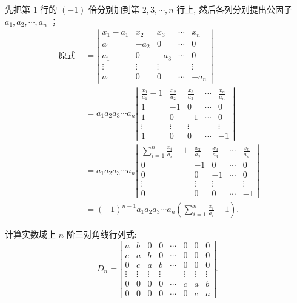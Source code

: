 \begin{solution}
    先把第 1 行的 $(-1)$ 倍分别加到第 $2,3, \cdots, n$ 行上, 然后各列分别提出公因子 $a_1, a_2, \cdots, a_n$ ；
\[
\begin{aligned}
\text { 原式 } & =\left|\begin{array}{ccccc}
x_1-a_1 & x_2 & x_3 & \cdots & x_n \\
a_1 & -a_2 & 0 & \cdots & 0 \\
a_1 & 0 & -a_3 & \cdots & 0 \\
\vdots & \vdots & \vdots & & \vdots \\
a_1 & 0 & 0 & \cdots & -a_n
\end{array}\right| \\
& =a_1 a_2 a_3 \cdots a_n\left|\begin{array}{ccccc}
\frac{x_1}{a_1}-1 & \frac{x_2}{a_2} & \frac{x_3}{a_3} & \cdots & \frac{x_n}{a_n} \\
1 & -1 & 0 & \cdots & 0 \\
1 & 0 & -1 & \cdots & 0 \\
\vdots & \vdots & \vdots & & \vdots \\
1 & 0 & 0 & \cdots & -1
\end{array}\right| \\
& =a_1 a_2 a_3 \cdots a_n\left|\begin{array}{ccccc}
\sum_{i=1}^n \frac{x_i}{a_i}-1 & \frac{x_2}{a_2} & \frac{x_3}{a_3} & \cdots & \frac{x_n}{a_n} \\
0 & -1 & 0 & \cdots & 0 \\
0 & 0 & -1 & \cdots & 0 \\
\vdots & \vdots & \vdots & & \vdots \\
0 & 0 & 0 & \cdots & -1
\end{array}\right| \\
& =(-1)^{n-1} a_1 a_2 a_3 \cdots a_n\left(\sum_{i=1}^n \frac{x_i}{a_i}-1\right) .
\end{aligned}
\]
\end{solution}

\begin{problem}
    计算实数域上 $n$ 阶三对角线行列式:
\[
D_n=\left|\begin{array}{cccccccc}
a & b & 0 & 0 & \cdots & 0 & 0 & 0 \\
c & a & b & 0 & \cdots & 0 & 0 & 0 \\
0 & c & a & b & \cdots & 0 & 0 & 0 \\
\vdots & \vdots & \vdots & \vdots & & \vdots & \vdots & \vdots \\
0 & 0 & 0 & 0 & \cdots & c & a & b \\
0 & 0 & 0 & 0 & \cdots & 0 & c & a
\end{array}\right| .
\]
\end{problem}

